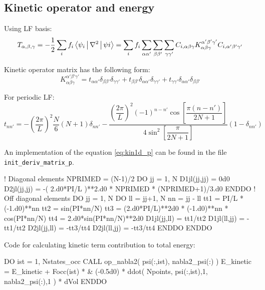 \subsection{Kinetic operator and energy}

Using LF basis:
\begin{equation}
T_{\alpha,\beta,\gamma} = -\frac{1}{2} \sum_{i} f_{i}
\Braket{ \psi_{i} | \nabla^2 | \psi{i} } =
\sum_{i} f_{i} \sum_{\alpha\alpha'} \sum_{\beta\beta'} \sum_{\gamma\gamma'}
C_{i,\alpha\beta\gamma} K_{\alpha\beta\gamma}^{\alpha'\beta'\gamma'}
C_{i,\alpha'\beta'\gamma'}
\end{equation}

Kinetic operator matrix has the following form:
\begin{equation}
K_{\alpha\beta\gamma}^{\alpha'\beta'\gamma'} =
t_{\alpha\alpha'}\delta_{\beta\beta'}\delta_{\gamma\gamma'} +
t_{\beta\beta'}\delta_{\alpha\alpha'}\delta_{\gamma\gamma'} +
t_{\gamma\gamma'}\delta_{\alpha\alpha'}\delta_{\beta\beta'}
\end{equation}

For periodic LF:
\begin{equation}
t_{nn'} = -\left( \frac{2\pi}{L} \right)^2 \frac{N}{6} \left( N + 1 \right) \delta_{nn'} -
\dfrac{ \left(\dfrac{2\pi}{L}\right)^2 (-1)^{n-n'}\cos\left[\dfrac{\pi(n-n')}{2N+1}\right]}
{4\sin^2\left[\dfrac{\pi}{2N+1}\right]}
(1-\delta_{nn'})
\label{eq:kin1d_p}
\end{equation}

An implementation of the equation \eqref{eq:kin1d_p} can be found in the file
{\tt init\_deriv\_matrix\_p}.
\begin{fortrancode}
! Diagonal elements
NPRIMED = (N-1)/2
DO jj = 1, N
  D1jl(jj,jj) = 0d0
  D2jl(jj,jj) = -( 2.d0*PI/L )**2.d0 * NPRIMED * (NPRIMED+1)/3.d0
ENDDO
! Off diagonal elements
DO jj = 1, N
  DO ll = jj+1, N
    nn = jj - ll
    tt1 = PI/L * (-1.d0)**nn
    tt2 = sin(PI*nn/N)
    tt3 = (2.d0*PI/L)**2d0 * (-1.d0)**nn * cos(PI*nn/N)
    tt4 = 2.d0*sin(PI*nn/N)**2d0
    D1jl(jj,ll) =  tt1/tt2
    D1jl(ll,jj) = -tt1/tt2
    D2jl(jj,ll) = -tt3/tt4
    D2jl(ll,jj) = -tt3/tt4
  ENDDO
ENDDO
\end{fortrancode}

Code for calculating kinetic term contribution to total energy:
\begin{fortrancode}
DO ist = 1, Nstates_occ
  CALL op_nabla2( psi(:,ist), nabla2_psi(:) )
  E_kinetic = E_kinetic + Focc(ist) * &
              (-0.5d0) * ddot( Npoints, psi(:,ist),1, nabla2_psi(:),1 ) * dVol
ENDDO
\end{fortrancode}

